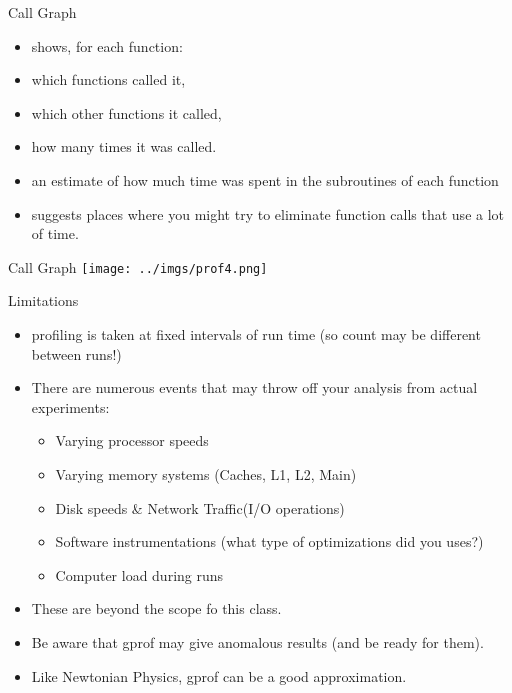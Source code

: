 \documentclass{beamer}
\begin{document}
\begin{frame}{Call Graph}
\begin{itemize}
\item shows, for each function: 
\item which functions called it, 
\item which other functions it called,  
\item how many times it was called. 

\item an estimate of how much time was spent in the subroutines of each function 

\item suggests places where you might try to eliminate function calls that use a lot of time.
\end{itemize}
\end{frame}

\begin{frame}{Call Graph}
\texttt{[image: ../imgs/prof4.png]}
\end{frame}

\begin{frame}{Limitations}
\begin{itemize}

\item profiling is taken at fixed intervals of run time (so count may be different between runs!)
\item There are numerous events that may throw off your analysis from actual experiments:
\begin{itemize}
\item Varying processor speeds
\item Varying memory systems (Caches, L1, L2, Main)
\item Disk speeds \& Network Traffic(I/O operations)
\item Software instrumentations (what type of optimizations did you uses?)
\item Computer load during runs
\end{itemize}
\item These are beyond the scope fo this class.
\item Be aware that gprof may give anomalous results (and be ready for them).
\item Like Newtonian Physics, gprof can be a good approximation.
\end{itemize}
\end{frame}
\end{document}
